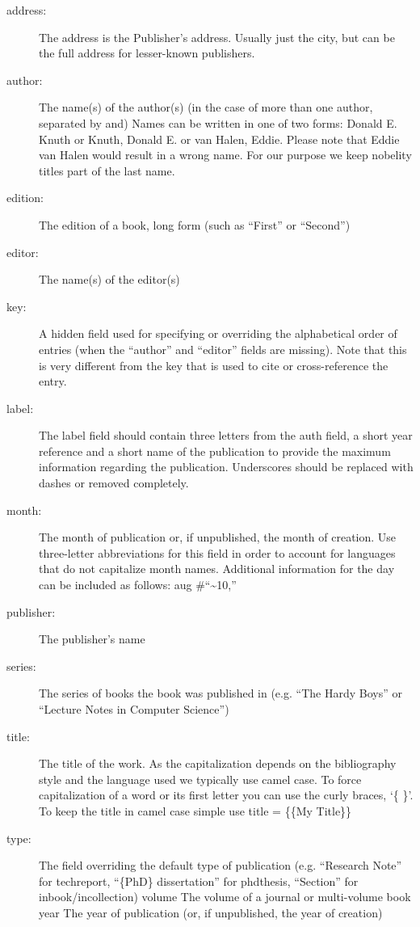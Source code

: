 \begin{description}
\item[address:]
The address is the Publisher's address. Usually just the city, but can
be the full address for lesser-known publishers.
\item[author:]
The name(s) of the author(s) (in the case of more than one author,
separated by and) Names can be written in one of two forms: Donald E.
Knuth or Knuth, Donald E. or van Halen, Eddie. Please note that Eddie
van Halen would result in a wrong name. For our purpose we keep nobelity
titles part of the last name.
\item[edition:]
The edition of a book, long form (such as ``First'' or ``Second'')
\item[editor:]
The name(s) of the editor(s)
\item[key:]
A hidden field used for specifying or overriding the alphabetical order
of entries (when the ``author'' and ``editor'' fields are missing). Note
that this is very different from the key that is used to cite or
cross-reference the entry.
\item[label:]
The label field should contain three letters from the auth field, a
short year reference and a short name of the publication to provide the
maximum information regarding the publication. Underscores should be
replaced with dashes or removed completely.
\item[month:]
The month of publication or, if unpublished, the month of creation. Use
three-letter abbreviations for this field in order to account for
languages that do not capitalize month names. Additional information for
the day can be included as follows: aug \#``\textasciitilde{}10,''
\item[publisher:]
The publisher's name
\item[series:]
The series of books the book was published in (e.g. ``The Hardy Boys''
or ``Lecture Notes in Computer Science'')
\item[title:]
The title of the work. As the capitalization depends on the bibliography
style and the language used we typically use camel case. To force
capitalization of a word or its first letter you can use the curly
braces, `\{ \}'. To keep the title in camel case simple use title =
\{\{My Title\}\}
\item[type:]
The field overriding the default type of publication (e.g. ``Research
Note'' for techreport, ``\{PhD\} dissertation'' for phdthesis,
``Section'' for inbook/incollection) volume The volume of a journal or
multi-volume book year The year of publication (or, if unpublished, the
year of creation)
\end{description}

